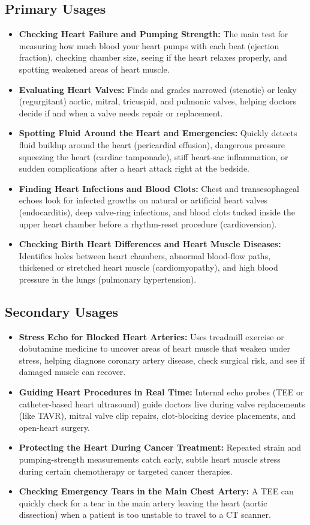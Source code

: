\subsection{Primary Usages}
\begin{itemize}
\item \textbf{Checking Heart Failure and Pumping Strength:} The main test for measuring how much blood your heart pumps with each beat (ejection fraction), checking chamber size, seeing if the heart relaxes properly, and spotting weakened areas of heart muscle.
\item \textbf{Evaluating Heart Valves:} Finds and grades narrowed (stenotic) or leaky (regurgitant) aortic, mitral, tricuspid, and pulmonic valves, helping doctors decide if and when a valve needs repair or replacement.
\item \textbf{Spotting Fluid Around the Heart and Emergencies:} Quickly detects fluid buildup around the heart (pericardial effusion), dangerous pressure squeezing the heart (cardiac tamponade), stiff heart-sac inflammation, or sudden complications after a heart attack right at the bedside.
\item \textbf{Finding Heart Infections and Blood Clots:} Chest and transesophageal echoes look for infected growths on natural or artificial heart valves (endocarditis), deep valve-ring infections, and blood clots tucked inside the upper heart chamber before a rhythm-reset procedure (cardioversion).
\item \textbf{Checking Birth Heart Differences and Heart Muscle Diseases:} Identifies holes between heart chambers, abnormal blood-flow paths, thickened or stretched heart muscle (cardiomyopathy), and high blood pressure in the lungs (pulmonary hypertension).
\end{itemize}

\subsection{Secondary Usages}
\begin{itemize}
\item \textbf{Stress Echo for Blocked Heart Arteries:} Uses treadmill exercise or dobutamine medicine to uncover areas of heart muscle that weaken under stress, helping diagnose coronary artery disease, check surgical risk, and see if damaged muscle can recover.
\item \textbf{Guiding Heart Procedures in Real Time:} Internal echo probes (TEE or catheter-based heart ultrasound) guide doctors live during valve replacements (like TAVR), mitral valve clip repairs, clot-blocking device placements, and open-heart surgery.
\item \textbf{Protecting the Heart During Cancer Treatment:} Repeated strain and pumping-strength measurements catch early, subtle heart muscle stress during certain chemotherapy or targeted cancer therapies.
\item \textbf{Checking Emergency Tears in the Main Chest Artery:} A TEE can quickly check for a tear in the main artery leaving the heart (aortic dissection) when a patient is too unstable to travel to a CT scanner.
\end{itemize}


